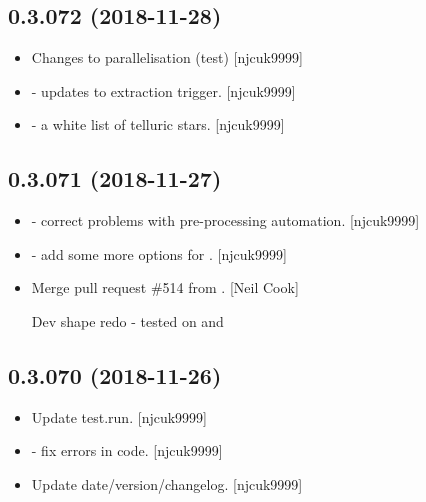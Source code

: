 \documentclass[a4paper,10pt,english]{report}
\begin{document}
\subsection{0.3.072 (2018-11-28)}
\label{\detokenize{misc/changelog:id251}}\begin{itemize}
\item {} 
Changes to parallelisation (test) {[}njcuk9999{]}

\item {} 
 - updates to extraction trigger. {[}njcuk9999{]}

\item {} 
 - a white list of telluric stars. {[}njcuk9999{]}

\end{itemize}


\subsection{0.3.071 (2018-11-27)}
\label{\detokenize{misc/changelog:id252}}\begin{itemize}
\item {} 
 - correct problems with pre-processing automation.
{[}njcuk9999{]}

\item {} 
 - add some more options for .
{[}njcuk9999{]}

\item {} 
Merge pull request \#514 from . {[}Neil Cook{]}

Dev shape redo - tested on  and 

\end{itemize}


\subsection{0.3.070 (2018-11-26)}
\label{\detokenize{misc/changelog:id253}}\begin{itemize}
\item {} 
Update test.run. {[}njcuk9999{]}

\item {} 
 - fix errors in code. {[}njcuk9999{]}

\item {} 
Update date/version/changelog. {[}njcuk9999{]}

\end{itemize}
\end{document}
